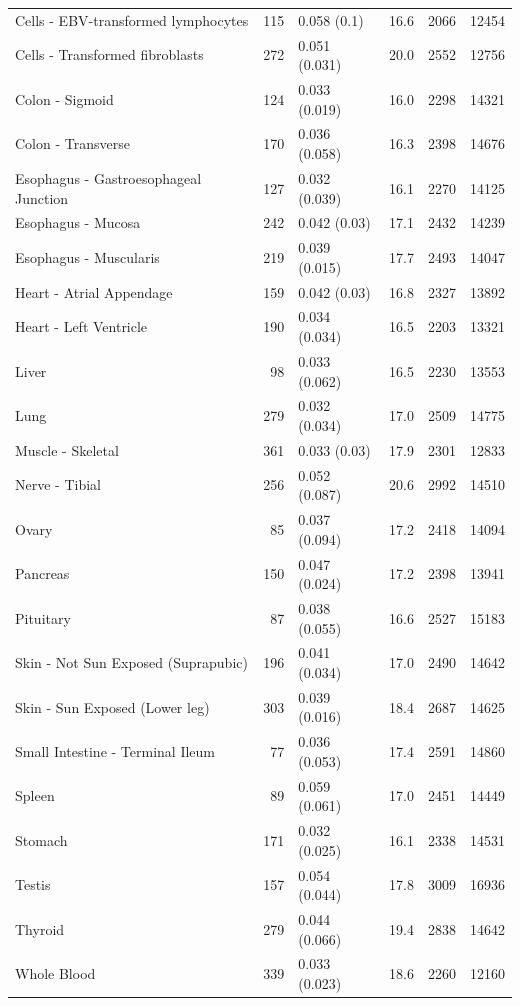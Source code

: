 \documentclass[10pt,letterpaper]{article}
\begin{document}
\begin{table}[!ht]
\begin{adjustwidth}{-2.25in}{0in}
\begin{tabular}{lrlrrr}
  Cells - EBV-transformed lymphocytes & 115 & 0.058 (0.1) & 16.6 & 2066 & 12454 \\ 
  Cells - Transformed fibroblasts & 272 & 0.051 (0.031) & 20.0 & 2552 & 12756 \\ 
  Colon - Sigmoid & 124 & 0.033 (0.019) & 16.0 & 2298 & 14321 \\ 
  Colon - Transverse & 170 & 0.036 (0.058) & 16.3 & 2398 & 14676 \\ 
  Esophagus - Gastroesophageal Junction & 127 & 0.032 (0.039) & 16.1 & 2270 & 14125 \\ 
  Esophagus - Mucosa & 242 & 0.042 (0.03) & 17.1 & 2432 & 14239 \\ 
  Esophagus - Muscularis & 219 & 0.039 (0.015) & 17.7 & 2493 & 14047 \\ 
  Heart - Atrial Appendage & 159 & 0.042 (0.03) & 16.8 & 2327 & 13892 \\ 
  Heart - Left Ventricle & 190 & 0.034 (0.034) & 16.5 & 2203 & 13321 \\ 
  Liver & 98 & 0.033 (0.062) & 16.5 & 2230 & 13553 \\ 
  Lung & 279 & 0.032 (0.034) & 17.0 & 2509 & 14775 \\ 
  Muscle - Skeletal & 361 & 0.033 (0.03) & 17.9 & 2301 & 12833 \\ 
  Nerve - Tibial & 256 & 0.052 (0.087) & 20.6 & 2992 & 14510 \\ 
  Ovary & 85 & 0.037 (0.094) & 17.2 & 2418 & 14094 \\ 
  Pancreas & 150 & 0.047 (0.024) & 17.2 & 2398 & 13941 \\ 
  Pituitary & 87 & 0.038 (0.055) & 16.6 & 2527 & 15183 \\ 
  Skin - Not Sun Exposed (Suprapubic) & 196 & 0.041 (0.034) & 17.0 & 2490 & 14642 \\ 
  Skin - Sun Exposed (Lower leg) & 303 & 0.039 (0.016) & 18.4 & 2687 & 14625 \\ 
  Small Intestine - Terminal Ileum & 77 & 0.036 (0.053) & 17.4 & 2591 & 14860 \\ 
  Spleen & 89 & 0.059 (0.061) & 17.0 & 2451 & 14449 \\ 
  Stomach & 171 & 0.032 (0.025) & 16.1 & 2338 & 14531 \\ 
  Testis & 157 & 0.054 (0.044) & 17.8 & 3009 & 16936 \\ 
  Thyroid & 279 & 0.044 (0.066) & 19.4 & 2838 & 14642 \\ 
  Whole Blood & 339 & 0.033 (0.023) & 18.6 & 2260 & 12160 \\ 
   \hline

\end{tabular}
\end{adjustwidth}
\end{table}
\end{document}

